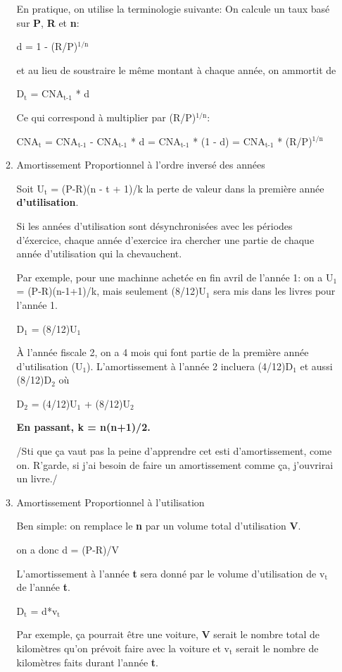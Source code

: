 \documentclass[11pt]{article}
\begin{document}
\begin{enumerate}
\begin{enumerate}
En pratique, on utilise la terminologie suivante:
On calcule un taux basé sur \textbf{P}, \textbf{R} et \textbf{n}:

d = 1 - (R/P)\(^{\text{1/n}}\)

et au lieu de soustraire le même montant à chaque année, on ammortit de

D\(_{\text{t}}\) = CNA\(_{\text{t-1}}\) * d

Ce qui correspond à multiplier par (R/P)\(^{\text{1/n}}\):

CNA\(_{\text{t}}\) = CNA\(_{\text{t-1}}\) - CNA\(_{\text{t-1}}\) * d = CNA\(_{\text{t-1}}\) * (1 - d) = CNA\(_{\text{t-1}}\) * (R/P)\(^{\text{1/n}}\)

\item Amortissement Proportionnel à l'ordre inversé des années
\label{sec:org4cc01ea}

Soit U\(_{\text{t}}\) = (P-R)(n - t + 1)/k la perte de valeur dans la première année \textbf{d'utilisation}.

Si les années d'utilisation sont désynchronisées avec les périodes d'éxercice,
chaque année d'exercice ira chercher une partie de chaque année d'utilisation qui
la chevauchent.

Par exemple, pour une machinne achetée en fin avril de l'année 1: on a
U\(_{\text{1}}\) = (P-R)(n-1+1)/k, mais seulement (8/12)U\(_{\text{1}}\) sera mis dans les livres pour
l'année 1.

D\(_{\text{1}}\) = (8/12)U\(_{\text{1}}\)

À l'année fiscale 2, on a 4 mois qui font partie de la première année
d'utilisation (U\(_{\text{1}}\)).  L'amortissement à l'année 2 incluera (4/12)D\(_{\text{1}}\) et aussi (8/12)D\(_{\text{2}}\)
où

D\(_{\text{2}}\) = (4/12)U\(_{\text{1}}\) + (8/12)U\(_{\text{2}}\)

\textbf{En passant, k = n(n+1)/2.}

/Sti que ça vaut pas la peine d'apprendre cet esti d'amortissement, come on.
R'garde, si j'ai besoin de faire un amortissement comme ça, j'ouvrirai un
livre./


\item Amortissement Proportionnel à l'utilisation
\label{sec:orgc9fe23a}

Ben simple: on remplace le \textbf{n} par un volume total d'utilisation \textbf{V}.

on a donc d = (P-R)/V

L'amortissement à l'année \textbf{t} sera donné par le volume d'utilisation de v\(_{\text{t}}\) de
l'année \textbf{t}.

D\(_{\text{t}}\) = d*v\(_{\text{t}}\)

Par exemple, ça pourrait être une voiture, \textbf{V} serait le nombre total de
kilomètres qu'on prévoit faire avec la voiture et v\(_{\text{t}}\) serait le nombre de
kilomètres faits durant l'année \textbf{t}.
\end{enumerate}
\end{enumerate}
\end{document}
